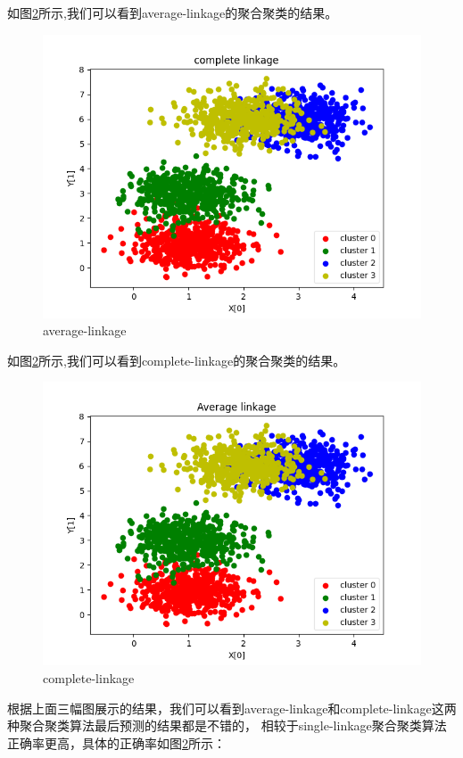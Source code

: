 \documentclass[UTF8,a4paper,10pt]{ctexart}
\begin{document}
如图\ref{fig:1}所示,我们可以看到average-linkage的聚合聚类的结果。

\begin{figure}[H]
    \centering
    \includegraphics[scale=0.7]{3.png}
    \caption{average-linkage}
    \label{fig:1}
\end{figure}


如图\ref{fig:1}所示,我们可以看到complete-linkage的聚合聚类的结果。

\begin{figure}[H]
    \centering
    \includegraphics[scale=0.7]{4.png}
    \caption{complete-linkage}
    \label{fig:1}
\end{figure}

根据上面三幅图展示的结果，我们可以看到average-linkage和complete-linkage这两种聚合聚类算法最后预测的结果都是不错的，
相较于single-linkage聚合聚类算法正确率更高，具体的正确率如图\ref{fig:1}所示：
\end{document}
